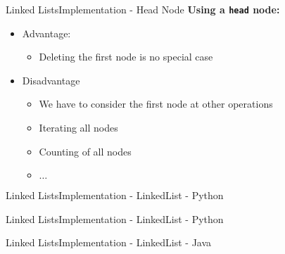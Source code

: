 \begin{frame}{Linked Lists}{Implementation - Head Node}
  \textbf{Using a \texttt{head} node:}
  \begin{itemize}
  \item<2->Advantage:
    \begin{itemize}
    \item<3->
      Deleting the first node is no special case
    \end{itemize}
  \item<4->Disadvantage
    \begin{itemize}
    \item<4->
      We have to consider the first node at other operations
    \item<5->
      Iterating all nodes
    \item<5->
      Counting of all nodes
    \item<6->
      $\dots$
    \end{itemize}
  \end{itemize}
  \begin{flushleft}
    
  \end{flushleft}
\end{frame}


\begin{frame}[fragile]{Linked Lists}{Implementation - LinkedList - Python}
  
\end{frame}


\begin{frame}[fragile]{Linked Lists}{Implementation - LinkedList - Python}
  
\end{frame}


\begin{frame}[fragile]{Linked Lists}{Implementation - LinkedList - Java}
  \vspace{-1.125em}
  
\end{frame}

